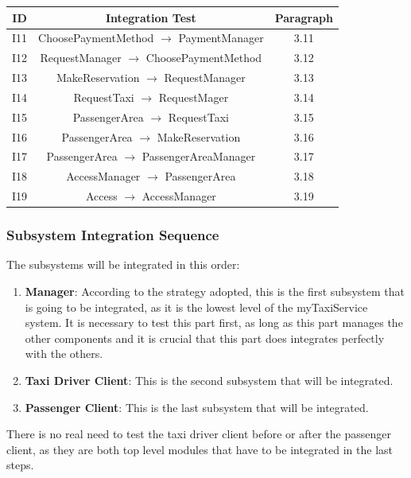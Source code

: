 \documentclass[18pt,oneside,a4paper, titlepage]{article}
\begin{document}
\begin{itemize}
\begin{center}
\begin{tabular}{c c c}
							\hline \textbf{ID} & \textbf{Integration Test} & \textbf{Paragraph} \\
							\hline		I11 & ChoosePaymentMethod $\rightarrow$ PaymentManager & 3.11\\
							\hline		I12 & RequestManager $\rightarrow$ ChoosePaymentMethod & 3.12 \\
							\hline		I13 & MakeReservation $\rightarrow$ RequestManager & 3.13\\
							\hline		I14 & RequestTaxi $\rightarrow$ RequestMager & 3.14\\
							\hline		I15 & PassengerArea $\rightarrow$ RequestTaxi & 3.15 \\
							\hline		I16 & PassengerArea $\rightarrow$ MakeReservation & 3.16 \\
							\hline		I17 & PassengerArea $\rightarrow$ PassengerAreaManager & 3.17\\
							\hline		I18 & AccessManager $\rightarrow$ PassengerArea & 3.18 \\
							\hline		I19 & Access $\rightarrow$ AccessManager & 3.19 \\
							\hline
						\end{tabular}
					\end{center}
			\end{itemize}
			
		\subsubsection{Subsystem Integration Sequence}
			
			The subsystems will be integrated in this order:
			\begin{enumerate}
				\item \textbf{Manager}: According to the strategy adopted, this is the first subsystem that is going to be integrated, as it is the lowest level of the myTaxiService system. It is necessary to test this part first, as long as this part manages the other components and it is crucial that this part does integrates perfectly with the others.
				\item \textbf{Taxi Driver Client}: This is the second subsystem that will be integrated.
				\item \textbf{Passenger Client}: This is the last subsystem that will be integrated.
			\end{enumerate}
			There is no real need to test the taxi driver client before or after the passenger client, as they are both top level modules that have to be integrated in the last steps. 
		
\end{document}
